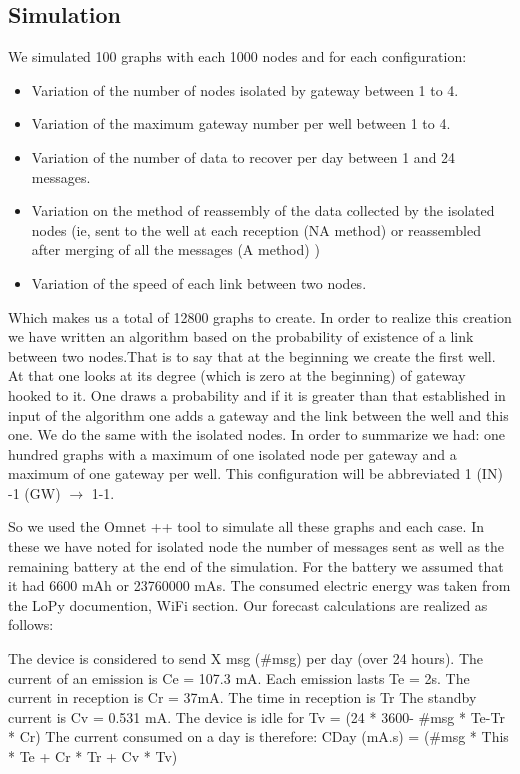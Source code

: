 \documentclass[conference]{IEEEtran}
\begin{document}
\subsection{Simulation}
 We simulated 100 graphs with each 1000 nodes and for each configuration:
\begin{itemize}
\item Variation of the number of nodes isolated by gateway between 1 to 4.
\item Variation of the maximum gateway number per well between 1 to 4.
\item Variation of the number of data to recover per day between 1 and 24 messages.
\item Variation on the method of reassembly of the data collected by the isolated nodes (ie, sent to the well at each reception (NA method) or reassembled after merging of all the messages  (A method) )
\item Variation of the speed of each link between two nodes.
\end{itemize}
Which makes us a total of 12800 graphs to create. In order to realize this creation we have written an algorithm based on the probability of existence of a link between two nodes.That is to say that at the beginning we create the first well. At that one looks at its degree (which is zero at the beginning) of gateway hooked to it. One draws a probability and if it is greater than that established in input of the algorithm one adds a gateway and the link between the well and this one. We do the same with the isolated nodes.
In order to summarize we had:
one hundred graphs with a maximum of one isolated node per gateway and a maximum of one gateway per well. This configuration will be abbreviated 1 (IN) -1 (GW) $\rightarrow$ 1-1. 

So we used the Omnet ++ tool to simulate all these graphs and each case. In these we have noted for isolated node the number of messages sent as well as the remaining battery at the end of the simulation.
For the battery we assumed that it had 6600 mAh or 23760000 mAs. The consumed electric energy was taken from the LoPy documention, WiFi section. Our forecast calculations are realized as follows:

The device is considered to send X msg (\#msg) per day (over 24 hours). The current of an emission is Ce = 107.3 mA. Each emission lasts Te = 2s.
The current in reception is Cr = 37mA. The time in reception is Tr
The standby current is Cv = 0.531 mA. The device is idle for Tv = (24 * 3600- \#msg * Te-Tr * Cr)
The current consumed on a day is therefore:
CDay (mA.s) = (\#msg * This * Te + Cr * Tr + Cv * Tv)
\end{document}

